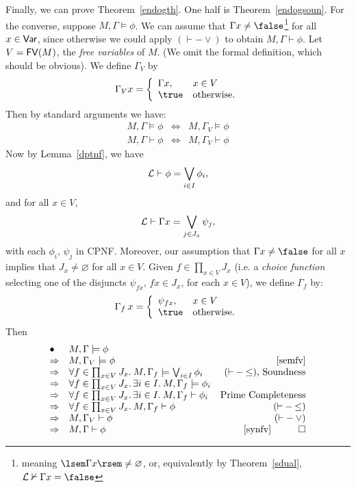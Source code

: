 Finally, we can prove Theorem~\ref{endogth}.
One half is Theorem~\ref{endogsoun}.
For the converse, suppose $M, \Gamma \models \phi$.
We can assume that $\Gamma x \not= \false$\footnote{ 
meaning $\lsem \Gamma x \rsem \not= \varnothing$, or, equivalently by Theorem~\ref{sdual}, ${\cal L} \nvdash \Gamma x = \false$}  
for all $x \in {\sf Var}$, since otherwise we could apply $({\vdash}-{\vee})$ to obtain $M, \Gamma \vdash \phi$.
Let $V = {\sf FV}(M)$, the {\em free variables} of $M$.
(We omit the formal definition, which should be obvious).
We define $\Gamma_{V}$ by
\[ \Gamma_{V} x = \left\{ \begin{array}{ll}
\Gamma x, & x \in V \\
\true & \mbox{otherwise.}
\end{array}
\right. \]
Then by standard arguments we have:
\begin{eqnarray}
M, \Gamma \models \phi & \Leftrightarrow & M, \Gamma_{V} \models \phi \label{semfv} \\
M, \Gamma \vdash \phi & \Leftrightarrow & M, \Gamma_{V} \vdash \phi  \label{synfv} 
\end{eqnarray}
Now by Lemma~\ref{dptnf}, we have
\[ {\cal L} \vdash \phi = \bigvee_{i \in I} \phi_{i}, \]
and for all $x \in V$,
\[ {\cal L} \vdash \Gamma x = \bigvee_{j \in J_{x}} \psi_{j}, \]
with each $\phi_{i}$, $\psi_{j}$ in {\sf CPNF}.
Moreover, our assumption that $\Gamma x \not= \false$ for all $x$ implies that
$J_{x} \not= \varnothing$ for all $x \in V$.
Given $f \in \prod_{x \in V} J_{x}$ (i.e. a {\em choice function} selecting one of the disjuncts $\psi_{f x}$, $fx \in J_{x}$, for each $x \in V$), we define $\Gamma_{f}$ by:
\[ \Gamma_{f} \: x = \left\{ \begin{array}{ll}
\psi_{f x}, & x \in V \\
\true & \mbox{otherwise.}
\end{array}
\right. \]
Then
\[ \begin{array}{llr}
\bullet & M, \Gamma \models \phi & \\
\Rightarrow & M, \Gamma_{V} \models \phi & \ref{semfv} \\
\Rightarrow & \forall f \in \prod_{x \in V} J_{x}. \: M, \Gamma_{f} \models \bigvee_{i \in I} \phi_{i} & \mbox{$({\vdash}-{\leq})$, Soundness} \\
\Rightarrow & \forall f \in \prod_{x \in V} J_{x}. \, \exists i \in I. \: M, \Gamma_{f} \models \phi_{i} & \\
\Rightarrow & \forall f \in \prod_{x \in V} J_{x}. \, \exists i \in I. \: M, \Gamma_{f} \vdash \phi_{i} &  \mbox{Prime Completeness} \\
\Rightarrow & \forall f \in \prod_{x \in V} J_{x}.  \: M, \Gamma_{f} \vdash \phi & ({\vdash}-{\leq}) \\
\Rightarrow & M, \Gamma_{V} \vdash \phi & ({\vdash}-{\vee}) \\
\Rightarrow & M, \Gamma \vdash \phi & \ref{synfv} \;\;\; \qed 
\end{array} \]


